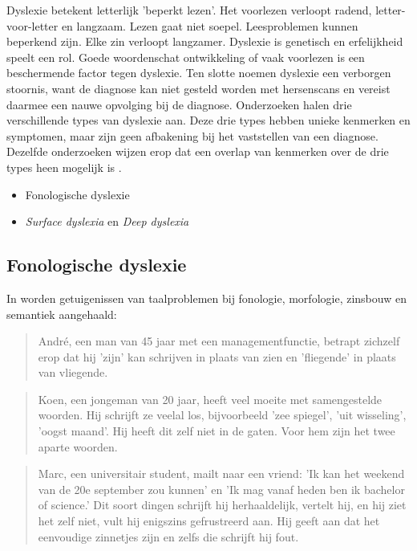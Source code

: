 Dyslexie betekent letterlijk 'beperkt lezen'. Het voorlezen verloopt radend, letter-voor-letter en langzaam. Lezen gaat niet soepel. Leesproblemen kunnen beperkend zijn. Elke zin verloopt langzamer. Dyslexie is genetisch en erfelijkheid speelt een rol. Goede woordenschat ontwikkeling of vaak voorlezen is een beschermende factor tegen dyslexie. Ten slotte noemen \textcite{Vellutino2004, Bonte2020} dyslexie een verborgen stoornis, want de diagnose kan niet gesteld worden met hersenscans en vereist daarmee een nauwe opvolging bij de diagnose. Onderzoeken halen drie verschillende types van dyslexie aan. Deze drie types hebben unieke kenmerken en symptomen, maar zijn geen afbakening bij het vaststellen van een diagnose. Dezelfde onderzoeken wijzen erop dat een overlap van kenmerken over de drie types heen mogelijk is \autocite{Rello2012, Vellutino2004}.

\begin{itemize}
	\item Fonologische dyslexie
	\item \textit{Surface dyslexia} en \textit{Deep dyslexia}
\end{itemize}

\subsection{Fonologische dyslexie}


In \textcite{Avontuur2015} worden getuigenissen van taalproblemen bij fonologie, morfologie, zinsbouw en semantiek aangehaald:

\begin{quote}
	André, een man van 45 jaar met een managementfunctie, betrapt zichzelf erop dat hij 'zijn' kan schrijven in plaats van zien en 'fliegende' in plaats van vliegende.
\end{quote}

\begin{quote}
	Koen, een jongeman van 20 jaar, heeft veel moeite met samengestelde woorden. Hij schrijft ze veelal los, bijvoorbeeld 'zee spiegel', 'uit wisseling', 'oogst maand'. Hij heeft dit zelf niet in de gaten. Voor hem zijn het twee aparte woorden.
\end{quote}

\begin{quote}
	Marc, een universitair student, mailt naar een vriend: 'Ik kan het weekend van de 20e september zou kunnen' en 'Ik mag vanaf heden ben ik bachelor of science.' Dit soort dingen schrijft hij herhaaldelijk, vertelt hij, en hij ziet het zelf niet, vult hij enigszins gefrustreerd aan. Hij geeft aan dat het eenvoudige zinnetjes zijn en zelfs die schrijft hij fout.
\end{quote}

